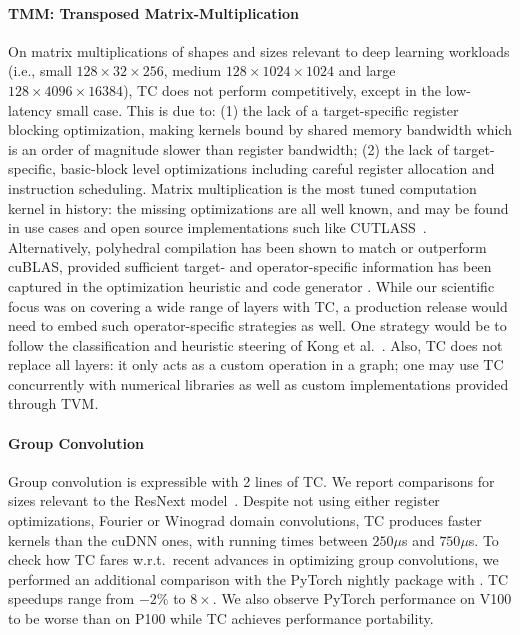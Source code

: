 \paragraph{TMM: Transposed Matrix-Multiplication}
On matrix multiplications of shapes and sizes relevant to deep learning
workloads (i.e., small $128\times 32\times 256$,
medium $128\times 1024\times 1024$ and large $128\times 4096\times 16384$), TC
does not perform competitively, except in the low-latency small case. This is
due to: (1) the lack of a target-specific register blocking optimization, making
kernels bound by shared memory bandwidth which is an order of magnitude slower
than register bandwidth; (2) the lack of target-specific, basic-block level optimizations including careful register allocation and instruction scheduling. Matrix multiplication is the most tuned
computation kernel in history: the missing optimizations are all well known, and
may be found in use cases and open source implementations such like
CUTLASS~\cite{CUTLASS}. Alternatively, polyhedral compilation has been shown to match or outperform cuBLAS, provided sufficient target- and operator-specific information has been captured in the optimization heuristic and code generator \cite{Elango:2018:DDL:3211346.3211354}. While our scientific focus was on covering a wide range of layers with TC, a production release would need to embed such operator-specific strategies as well. One strategy would be to follow the classification and heuristic steering of Kong et al.\ \cite{KongVocabulary}. Also, TC does not replace all layers: it only acts as a custom operation in a graph; one may use TC concurrently with numerical libraries as well as custom implementations provided through TVM.

\paragraph{Group Convolution}
Group convolution is expressible with 2 lines of TC. We report comparisons for
sizes relevant to the ResNext model~\cite{ResNext}. Despite not
using either register optimizations, Fourier or Winograd domain convolutions,
TC produces faster kernels than the cuDNN ones, with running times between
$250\mu$s and $750\mu$s. To check how TC fares w.r.t.\ recent advances in optimizing group convolutions, we performed an additional comparison with the
PyTorch nightly package  with
. TC speedups range
from $-2\%$ to $8\times$. We also observe
PyTorch performance on V100 to be worse than on P100 while TC achieves
performance portability.

